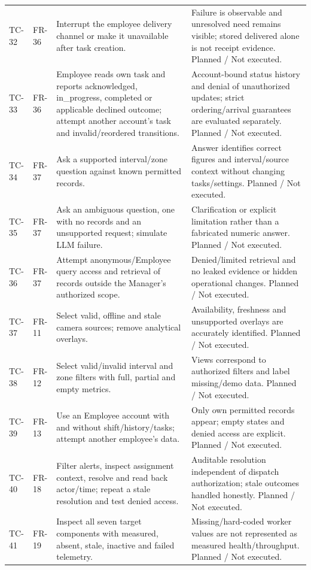 \begin{longtable}{P{0.08\textwidth}P{0.13\textwidth}P{0.35\textwidth}P{0.34\textwidth}}
TC-32 & FR-36 & Interrupt the employee delivery channel or make it unavailable after task creation. & Failure is observable and unresolved need remains visible; stored delivered alone is not receipt evidence. Planned / Not executed.\\
TC-33 & FR-36 & Employee reads own task and reports acknowledged, in\_progress, completed or applicable declined outcome; attempt another account's task and invalid/reordered transitions. & Account-bound status history and denial of unauthorized updates; strict ordering/arrival guarantees are evaluated separately. Planned / Not executed.\\
TC-34 & FR-37 & Ask a supported interval/zone question against known permitted records. & Answer identifies correct figures and interval/source context without changing tasks/settings. Planned / Not executed.\\
TC-35 & FR-37 & Ask an ambiguous question, one with no records and an unsupported request; simulate LLM failure. & Clarification or explicit limitation rather than a fabricated numeric answer. Planned / Not executed.\\
TC-36 & FR-37 & Attempt anonymous/Employee query access and retrieval of records outside the Manager's authorized scope. & Denied/limited retrieval and no leaked evidence or hidden operational changes. Planned / Not executed.\\
TC-37 & FR-11 & Select valid, offline and stale camera sources; remove analytical overlays. & Availability, freshness and unsupported overlays are accurately identified. Planned / Not executed.\\
TC-38 & FR-12 & Select valid/invalid interval and zone filters with full, partial and empty metrics. & Views correspond to authorized filters and label missing/demo data. Planned / Not executed.\\
TC-39 & FR-13 & Use an Employee account with and without shift/history/tasks; attempt another employee's data. & Only own permitted records appear; empty states and denied access are explicit. Planned / Not executed.\\
TC-40 & FR-18 & Filter alerts, inspect assignment context, resolve and read back actor/time; repeat a stale resolution and test denied access. & Auditable resolution independent of dispatch authorization; stale outcomes handled honestly. Planned / Not executed.\\
TC-41 & FR-19 & Inspect all seven target components with measured, absent, stale, inactive and failed telemetry. & Missing/hard-coded worker values are not represented as measured health/throughput. Planned / Not executed.\\

\end{longtable}
